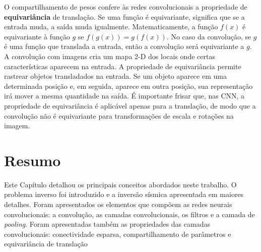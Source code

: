 O compartilhamento de pesos confere às redes convolucionais a propriedade de \textbf{equivariância} de
translação. Se uma função é equivariante, significa que se a entrada muda,
a saída muda igualmente. Matematicamente, a função $f(x)$ é equivariante à função $g$ se
$f(g(x)) = g(f(x))$. No caso da convolução, se $g$ é uma função que translada a entrada, então
a convolução será equivariante a $g$.
A convolução com imagens cria um mapa 2-D dos locais onde certas características aparecem na entrada.
A propriedade de equivariância permite rastrear objetos transladados na entrada. Se um objeto aparece
em uma determinada posição e, em seguida, aparece em outra posição, sua representação
irá mover a mesma quantidade na saída. É importante frisar que, nas CNN, a propriedade de equivariância
é aplicável apenas para a translação, de modo que a convolução não é equivariante para transformações 
de escala e rotações na imagem.

\section{Resumo}

Este Capítulo detalhou os principais conceitos abordados neste trabalho. O
problema inverso foi introduzido e a inversão sísmica apresentada em
maiores detalhes. Foram apresentados os elementos que compõem as redes
neurais convolucionais: a convolução, as camadas convolucionais, os filtros e a camada de \textit{pooling}.
Foram apresentadas também as propriedades das camadas convolucionais: conectividade esparsa,
compartilhamento de parâmetros e equivariância de translação 
